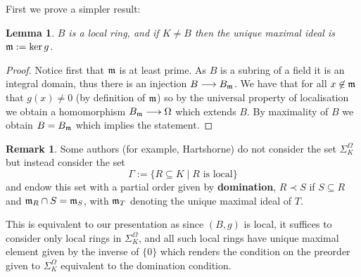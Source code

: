 \documentclass[12pt]{article}
\theoremstyle{plain}
\newtheorem{lemma}[thm]{Lemma}
\theoremstyle{definition}
\newtheorem{remark}[thm]{Remark}
\newcommand{\lto}{\longrightarrow}
\begin{document}
	First we prove a simpler result:
	\begin{lemma}
		\label{lem:local_kernel} $B$ is a local ring, and if $K \neq B$ then the unique maximal ideal is $\frak{m} := \ker g$.
	\end{lemma}
	\begin{proof}
		Notice first that $\frak{m}$ is at least prime. As $B$ is a subring of a field it is an integral domain, thus there is an injection $B \lto B_\frak{m}$. We have that for all $x \not\in \frak{m}$ that $g(x) \neq 0$ (by definition of $\frak{m}$) so by the universal property of localisation we obtain a homomorphism $B_\frak{m} \lto \Omega$ which extends $B$. By maximality of $B$ we obtain $B = B_\frak{m}$ which implies the statement.
	\end{proof}
	\begin{remark}
		Some authors (for example, Hartshorne) do not consider the set $\Sigma_K^\Omega$ but instead consider the set
		\begin{equation}
			\Gamma := \lbrace R \subseteq K \mid R\text{ is local}\rbrace
		\end{equation}
		and endow this set with a partial order given by \textbf{domination}, $R \prec S$ if $S \subseteq R$ and $\frak{m}_R \cap S = \frak{m}_S$, with $\frak{m}_T$ denoting the unique maximal ideal of $T$.
		
		This is equivalent to our presentation as since $(B,g)$ is local, it suffices to consider only local rings in $\Sigma_K^\Omega$, and all such local rings have unique maximal element given by the inverse of $\lbrace 0 \rbrace$ which renders the condition on the preorder given to $\Sigma_K^\Omega$ equivalent to the domination condition.
	\end{remark}
	
	
	
\end{document}
